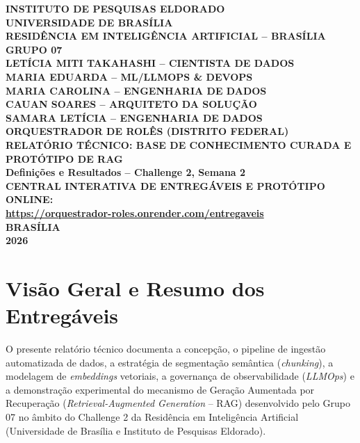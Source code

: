 \documentclass[12pt,a4paper]{article}
\begin{document}
\begin{titlepage}
\begin{center}
{\bfseries INSTITUTO DE PESQUISAS ELDORADO\\
UNIVERSIDADE DE BRASÍLIA\\
RESIDÊNCIA EM INTELIGÊNCIA ARTIFICIAL -- BRASÍLIA\\[2.8cm]

GRUPO 07\\[0.35cm]
LETÍCIA MITI TAKAHASHI -- CIENTISTA DE DADOS\\
MARIA EDUARDA -- ML/LLMOPS \& DEVOPS\\
MARIA CAROLINA -- ENGENHARIA DE DADOS\\
CAUAN SOARES -- ARQUITETO DA SOLUÇÃO\\
SAMARA LETÍCIA -- ENGENHARIA DE DADOS\\[3.0cm]

ORQUESTRADOR DE ROLÊS (DISTRITO FEDERAL)\\[0.3cm]
{\normalsize RELATÓRIO TÉCNICO: BASE DE CONHECIMENTO CURADA E PROTÓTIPO DE RAG\\
Definições e Resultados -- Challenge 2, Semana 2}\\[1.2cm]

{\normalfont\small CENTRAL INTERATIVA DE ENTREGÁVEIS E PROTÓTIPO ONLINE:\\
\textbf{\url{https://orquestrador-roles.onrender.com/entregaveis}}}\\[2.8cm]

BRASÍLIA\\
2026}
\end{center}
\end{titlepage}

\setcounter{page}{1}

\section{Visão Geral e Resumo dos Entregáveis}

O presente relatório técnico documenta a concepção, o pipeline de ingestão automatizada de dados, a estratégia de segmentação semântica (\textit{chunking}), a modelagem de \textit{embeddings} vetoriais, a governança de observabilidade (\textit{LLMOps}) e a demonstração experimental do mecanismo de Geração Aumentada por Recuperação (\textit{Retrieval-Augmented Generation} -- RAG) desenvolvido pelo Grupo 07 no âmbito do Challenge 2 da Residência em Inteligência Artificial (Universidade de Brasília e Instituto de Pesquisas Eldorado).
\end{document}
